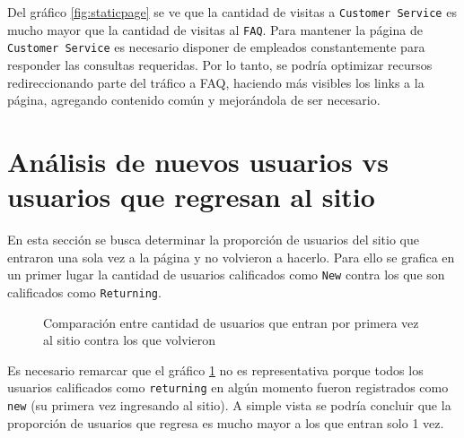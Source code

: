 \documentclass[a4paper]{article}
\begin{document}
Del gráfico \ref{fig:staticpage} se ve que la cantidad de visitas a \texttt{Customer Service} es mucho mayor que la cantidad de visitas al \texttt{FAQ}. Para mantener la página de \texttt{Customer Service} es necesario disponer de empleados constantemente para responder las consultas requeridas. Por lo tanto, se podría optimizar recursos redireccionando parte del tráfico a FAQ, haciendo más visibles los links a la página, agregando contenido común y mejorándola de ser necesario.

\section{Análisis de nuevos usuarios vs usuarios que regresan al sitio}

En esta sección se busca determinar la proporción de usuarios del sitio que entraron una sola vez a la página y no volvieron a hacerlo. Para ello se grafica en un primer lugar la cantidad de usuarios calificados como \texttt{New} contra los que son calificados como \texttt{Returning}.

\begin{figure}[h!]
	\caption{Comparación entre cantidad de usuarios que entran por primera vez al sitio contra los que volvieron}
	\label{fig:newvsreturningfalse}
\end{figure}

Es necesario remarcar que el gráfico \ref{fig:newvsreturningfalse} no es representativa porque todos los usuarios calificados como \texttt{returning} en algún momento fueron registrados como \texttt{new} (su primera vez ingresando al sitio). A simple vista se podría concluir que la proporción de usuarios que regresa es mucho mayor a los que entran solo 1 vez. 
\end{document}
